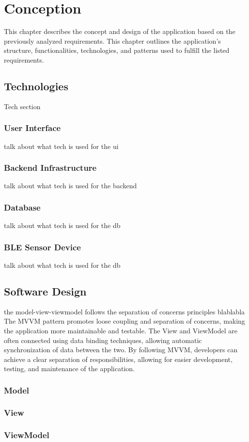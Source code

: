 \chapter{Conception}
This chapter describes the concept and design of the application based on the previously analyzed requirements. This chapter outlines the application's structure, functionalities, technologies, and patterns used to fulfill the listed requirements.





\section{Technologies}
Tech section
\subsection{User Interface}
talk about what tech is used for the ui
\subsection{Backend Infrastructure}
talk about what tech is used for the backend
\subsection{Database}
talk about what tech is used for the db
\subsection{BLE Sensor Device}
talk about what tech is used for the db


\section{Software Design}
the model-view-viewmodel follows the separation of concerns principles blablabla
The MVVM pattern promotes loose coupling and separation of concerns, making the application more maintainable and testable. The View and ViewModel are often connected using data binding techniques, allowing automatic synchronization of data between the two.
By following MVVM, developers can achieve a clear separation of responsibilities, allowing for easier development, testing, and maintenance of the application.
\subsection{Model}
\subsection{View}
\subsection{ViewModel}


